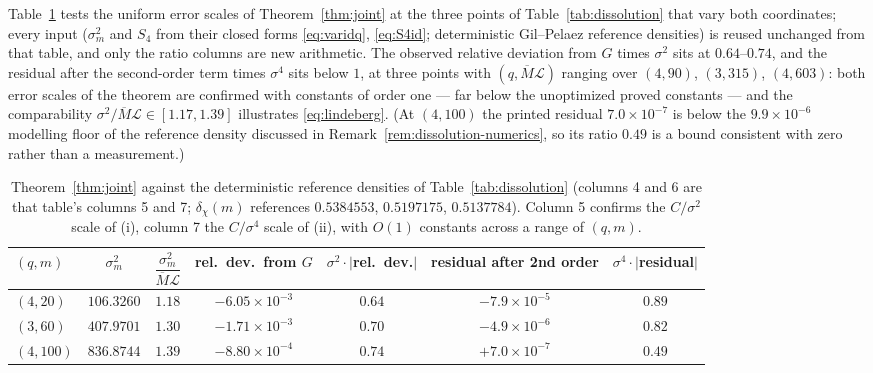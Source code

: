 \begin{remark}\label{rem:joint-numerics}
Table~\ref{tab:joint} tests the uniform error scales of
Theorem~\ref{thm:joint} at the three points of
Table~\ref{tab:dissolution} that vary both coordinates; every input
($\sigma_m^2$ and $S_4$ from their closed forms \eqref{eq:varidq},
\eqref{eq:S4id}; deterministic Gil--Pelaez reference densities) is
reused unchanged from that table, and only the ratio columns are new
arithmetic. The observed relative deviation from $G$ times $\sigma^2$
sits at $0.64$--$0.74$, and the residual after the second-order term
times $\sigma^4$ sits below $1$, at three points with
$(q,\overline M\mathcal L)$ ranging over $(4,90)$, $(3,315)$,
$(4,603)$: both error scales of the theorem are confirmed with
constants of order one --- far below the unoptimized proved constants
--- and the comparability $\sigma^2/\overline M\mathcal L\in[1.17,1.39]$
illustrates \eqref{eq:lindeberg}. (At $(4,100)$ the printed residual
$7.0\times10^{-7}$ is below the $9.9\times10^{-6}$ modelling floor of
the reference density discussed in
Remark~\ref{rem:dissolution-numerics}, so its ratio $0.49$ is a bound
consistent with zero rather than a measurement.)

\begin{table}[h]\centering
\begin{tabular}{lcccccc}
\toprule
$(q,m)$ & $\sigma_m^2$ & $\dfrac{\sigma_m^2}{\overline M\mathcal L}$ &
rel.\ dev.\ from $G$ & $\sigma^2\cdot|$rel.\ dev.$|$ &
residual after 2nd order & $\sigma^4\cdot|$residual$|$ \\
\midrule
$(4,20)$  & $106.3260$ & $1.18$ & $-6.05\times10^{-3}$ & $0.64$ & $-7.9\times10^{-5}$ & $0.89$ \\
$(3,60)$  & $407.9701$ & $1.30$ & $-1.71\times10^{-3}$ & $0.70$ & $-4.9\times10^{-6}$ & $0.82$ \\
$(4,100)$ & $836.8744$ & $1.39$ & $-8.80\times10^{-4}$ & $0.74$ & $+7.0\times10^{-7}$ & $0.49$ \\
\bottomrule
\end{tabular}
\caption{Theorem~\ref{thm:joint} against the deterministic reference
densities of Table~\ref{tab:dissolution} (columns 4 and 6 are that
table's columns 5 and 7; $\delta_\chi(m)$ references
$0.5384553$, $0.5197175$, $0.5137784$). Column 5 confirms the
$C/\sigma^2$ scale of (i), column 7 the $C/\sigma^4$ scale of (ii),
with $O(1)$ constants across a range of $(q,m)$.}
\label{tab:joint}
\end{table}
\end{remark}

